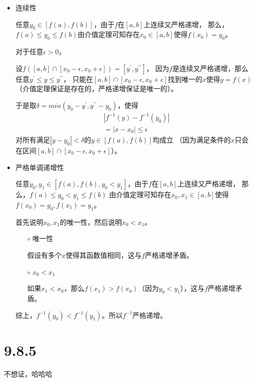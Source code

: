 \documentclass{article}
\begin{document}
\begin{itemize}
  \item 连续性

        任意$y_0 \in [f(a), f(b)]$，由于$f$在$[a, b]$上连续又严格递增，
        那么，$f(a) \leq y_0 \leq f(b)$由介值定理可知存在$x_0 \in [a, b]$使得$f(x_0) = y_0$。

        对于任意$\epsilon > 0$，

        设$f([a, b] \cap [x_0 - \epsilon, x_0 + \epsilon]) = [y^\prime, y^{\prime\prime}]$，
        因为$f$是连续又严格递增，那么任意$y^\prime \leq y \leq y^{\prime\prime}$，
        只能在$[a, b] \cap [x_0 - \epsilon, x_0 + \epsilon]$找到唯一的$x$使得$y = f(x)$
        （介值定理保证是存在的，严格递增保证是唯一的）。

        于是取$\delta = min(y_0 - y^\prime, y^{\prime\prime} - y_0)$，使得
        \begin{align*}
           & |f^{-1}(y) - f^{-1}(y_0)| \\
           & = |x - x_0| \leq \epsilon
        \end{align*}
        对所有满足$|y - y_0| < \delta$的$y \in [f(a),f(b)]$均成立
        （因为满足条件的$x$只会在区间$[a, b] \cap [x_0 - \epsilon, x_0 + \epsilon]$）。

  \item 严格单调递增性

        任意$y_0, y_1 \in [f(a), f(b), y_0 < y_1]$，由于$f$在$[a, b]$上连续又严格递增，
        那么，$f(a) \leq y_0 < y_1 \leq f(b)$
        由介值定理可知存在$x_0,x_1 \in [a, b]$使得$f(x_0) = y_0, f(x_1) = y_1$。

        首先说明$x_0, x_1$的唯一性，然后说明$x_0 < x_1$。

        \begin{itemize}
          \item[$\circ$] 唯一性

                假设有多个$x$使得其函数值相同，这与$f$严格递增矛盾。
          \item[$\circ$] $x_0 < x_1$

              如果$x_1 < x_0$，那么$f(x_1) > f(x_0)$（因为$y_0 < y_1$），这与$f$严格递增矛盾。
        \end{itemize}

        综上，$f^{-1}(y_0) < f^{-1}(y_1)$。所以$f^{-1}$严格递增。
\end{itemize}

\section*{9.8.5}

不想证，哈哈哈
\end{document}
